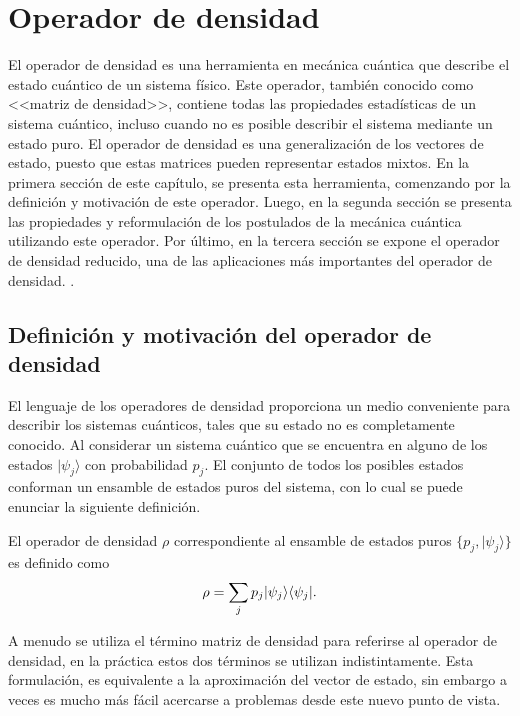 \chapter{Operador de densidad}\label{OpDensidad}
El operador de densidad es una herramienta en mecánica cuántica que describe el
estado cuántico de un sistema físico. Este operador, también conocido como
<<matriz de densidad>>, contiene todas las propiedades estadísticas de un sistema cuántico, incluso cuando no es posible describir el sistema mediante un estado puro. El operador de densidad es una generalización de los vectores de estado, puesto que estas matrices pueden representar estados mixtos.   En la primera sección de este capítulo, se presenta esta herramienta, comenzando por la definición y motivación de este operador. Luego, en la segunda sección  se presenta las propiedades y reformulación de los postulados de la mecánica cuántica utilizando este operador. Por último, en la tercera sección se expone el operador de densidad reducido, una de las aplicaciones más importantes del operador de densidad.
. 

\section{Definición y motivación  del operador de densidad} %
El lenguaje de los operadores de densidad proporciona un  medio conveniente
para describir los sistemas cuánticos, tales que su estado no es completamente
conocido. Al considerar un sistema cuántico que se encuentra en alguno de los
estados $|\psi_j \rangle $ con probabilidad $p_j$. El conjunto de todos los
posibles estados conforman un ensamble de estados puros del sistema, con lo
cual se puede enunciar la siguiente definición. 

\begin{definition} El operador de densidad
$\rho$ correspondiente al ensamble de estados puros $\{p_j,|\psi_j \rangle \}$
es definido como {\cite{wilde2011classical}}
  	\begin{equation}{\label{defdensityoperator}}
  		\rho=\sum_{j}p_j|\psi_j\rangle \langle \psi_j|.
  	\end{equation}
\end{definition}
A menudo se utiliza el término matriz de densidad para referirse al operador de
densidad, en la práctica estos dos términos se utilizan indistintamente. Esta
formulación, es equivalente a la aproximación del vector de estado, sin embargo
a veces es mucho más fácil acercarse a problemas desde este nuevo punto de
vista.
 
